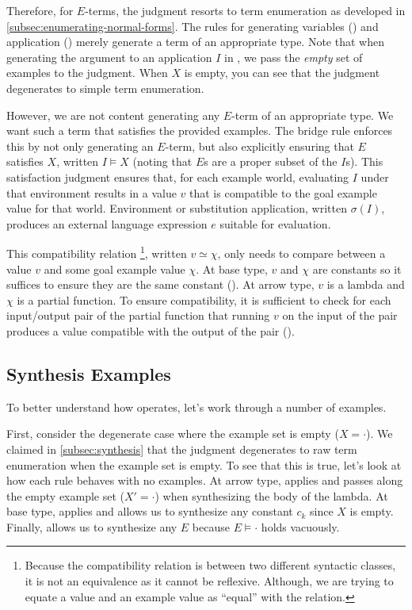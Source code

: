 Therefore, for $E$-terms, the  judgment resorts to term enumeration as developed in \autoref{subsec:enumerating-normal-forms}.
The rules for generating variables () and application () merely generate a term of an appropriate type.
Note that when generating the argument to an application $I$ in , we pass the \emph{empty} set of examples to the  judgment.
When $Χ$ is empty, you can see that the  judgment degenerates to simple term enumeration.

However, we are not content generating any $E$-term of an appropriate type.
We want such a term that satisfies the provided examples.
The bridge rule  enforces this by not only generating an $E$-term, but also explicitly ensuring that $E$ satisfies $Χ$, written $I ⊨ Χ$ (noting that $E$s are a proper subset of the $I$s).
This satisfaction judgment ensures that, for each example world, evaluating $I$ under that environment results in a value $v$ that is compatible to the goal example value for that world.
Environment or substitution application, written $σ(I)$, produces an external language expression $e$ suitable for evaluation.

This compatibility relation%
\footnote{%
  Because the compatibility relation is between two different syntactic classes, it is not an equivalence as it cannot be reflexive.
  Although, we are trying to equate a value and an example value as ``equal'' with the relation.
},
written $v ≃ χ$, only needs to compare between a value $v$ and some goal example value $χ$.
At base type, $v$ and $χ$ are constants so it suffices to ensure they are the same constant ().
At arrow type, $v$ is a lambda and $χ$ is a partial function.
To ensure compatibility, it is sufficient to check for each input/output pair of the partial function that running $v$ on the input of the pair produces a value compatible with the output of the pair ().

\subsection{Synthesis Examples}
\label{subsec:synthesis-examples}

To better understand how \lsyn{} operates, let's work through a number of examples.

\begin{example}
  First, consider the degenerate case where the example set is empty ($Χ = ·$).
  We claimed in \autoref{subsec:synthesis} that the  judgment degenerates to raw term enumeration when the example set is empty.
  To see that this is true, let's look at how each  rule behaves with no examples.
  At arrow type,  applies and passes along the empty example set ($Χ' = ·$) when synthesizing the body of the lambda.
  At base type,  applies and allows us to synthesize any constant $c_k$ since $Χ$ is empty.
  Finally,  allows us to synthesize any $E$ because $E ⊨ ·$ holds vacuously.
\end{example}

